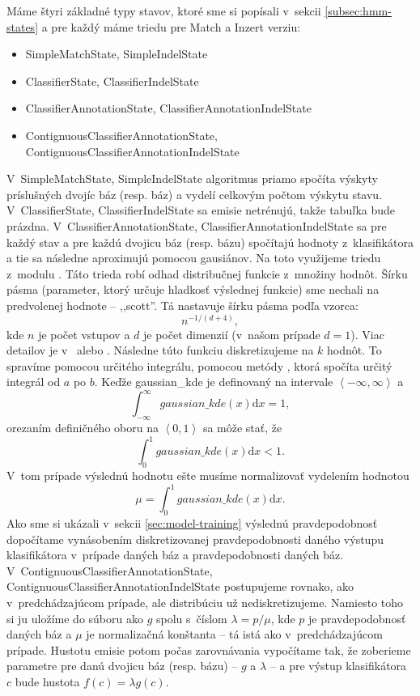 Máme štyri základné typy stavov, ktoré sme si popísali v~sekcii \ref{subsec:hmm-states} a pre každý máme triedu pre Match a Inzert verziu:
\begin{itemize}
    \item SimpleMatchState, SimpleIndelState
    \item ClassifierState, ClassifierIndelState
    \item ClassifierAnnotationState, ClassifierAnnotationIndelState
    \item ContignuousClassifierAnnotationState,\\ ContignuousClassifierAnnotationIndelState
\end{itemize}

V~SimpleMatchState, SimpleIndelState algoritmus priamo spočíta výskyty príslušných dvojíc báz (resp. báz) a vydelí celkovým počtom výskytu stavu.
V~ClassifierState, ClassifierIndelState sa emisie netrénujú, takže tabuľka bude prázdna.
V~ClassifierAnnotationState, ClassifierAnnotationIndelState sa pre každý stav a pre každú dvojicu báz (resp. bázu) spočítajú hodnoty z~klasifikátora a tie sa následne aproximujú pomocou gausiánov. Na toto využijeme triedu  z~modulu . Táto trieda robí odhad distribučnej funkcie z~množiny hodnôt. Šírku pásma (parameter, ktorý určuje hladkosť výslednej funkcie) sme nechali na predvolenej hodnote -- ,,scott''. Tá nastavuje šírku pásma podľa vzorca:
$$n^{-1/(d+4)},$$
kde $n$ je počet vstupov a $d$ je počet dimenzií (v~našom prípade $d = 1$). Viac detailov je v~\cite{scipydoc} alebo \cite{wiki:kde, rosenblatt1956remarks}. Následne túto funkciu diskretizujeme na $k$ hodnôt. To spravíme pomocou určitého integrálu, pomocou metódy , ktorá spočíta určitý integrál od $a$ po $b$.
Keďže gaussian\_kde je definovaný na intervale $\left<-\infty, \infty \right>$ a $$\int_{-\infty}^\infty \! gaussian\_kde(x) \mathrm{d}x = 1,$$ orezaním definičného oboru na $\left<0,1\right>$ sa môže stať, že $$\int_0^1 \! gaussian\_kde(x) \mathrm{d}x < 1.$$ V~tom prípade výslednú hodnotu ešte musíme normalizovať vydelením hodnotou $$\mu = \int_0^1 \! gaussian\_kde(x) \mathrm{d}x.$$ Ako sme si ukázali v~sekcii \ref{sec:model-training} výslednú pravdepodobnosť dopočítame vynásobením diskretizovanej pravdepodobnosti daného výstupu klasifikátora v~prípade daných báz a pravdepodobnosti daných báz.
V~ContignuousClassifierAnnotationState, ContignuousClassifierAnnotationIndelState postupujeme rovnako, ako v~predchádzajúcom prípade, ale distribúciu už nediskretizujeme. Namiesto toho si ju uložíme do súboru ako $g$ spolu s~číslom $\lambda = p/\mu$, kde $p$ je pravdepodobnosť daných báz a $\mu$ je normalizačná konštanta -- tá istá ako v~predchádzajúcom prípade. Hustotu emisie potom počas zarovnávania vypočítame tak, že zoberieme parametre pre danú dvojicu báz (resp. bázu) -- $g$ a $\lambda$ -- a pre výstup klasifikátora $c$ bude hustota $f(c) = \lambda g(c).$

